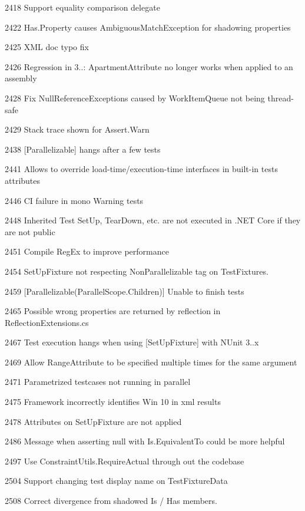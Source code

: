 \begin{DoxyItemize}
\item 2418 Support equality comparison delegate
\item 2422 Has.\+Property causes Ambiguous\+Match\+Exception for shadowing properties
\item 2425 X\+ML doc typo fix
\item 2426 Regression in 3..\+: Apartment\+Attribute no longer works when applied to an assembly
\item 2428 Fix Null\+Reference\+Exceptions caused by Work\+Item\+Queue not being thread-\/safe
\item 2429 Stack trace shown for Assert.\+Warn
\item 2438 \mbox{[}Parallelizable\mbox{]} hangs after a few tests
\item 2441 Allows to override load-\/time/execution-\/time interfaces in built-\/in tests attributes
\item 2446 CI failure in mono Warning tests
\item 2448 Inherited Test Set\+Up, Tear\+Down, etc. are not executed in .N\+ET Core if they are not public
\item 2451 Compile Reg\+Ex to improve performance
\item 2454 Set\+Up\+Fixture not respecting Non\+Parallelizable tag on Test\+Fixtures.
\item 2459 \mbox{[}Parallelizable(Parallel\+Scope.\+Children)\mbox{]} Unable to finish tests
\item 2465 Possible wrong properties are returned by reflection in Reflection\+Extensions.\+cs
\item 2467 Test execution hangs when using \mbox{[}Set\+Up\+Fixture\mbox{]} with N\+Unit 3..\+x
\item 2469 Allow Range\+Attribute to be specified multiple times for the same argument
\item 2471 Parametrized testcases not running in parallel
\item 2475 Framework incorrectly identifies Win 10 in xml results
\item 2478 Attributes on Set\+Up\+Fixture are not applied
\item 2486 Message when asserting null with Is.\+Equivalent\+To could be more helpful
\item 2497 Use Constraint\+Utils.\+Require\+Actual through out the codebase
\item 2504 Support changing test display name on Test\+Fixture\+Data
\item 2508 Correct divergence from shadowed Is / Has members.

\end{DoxyItemize}

